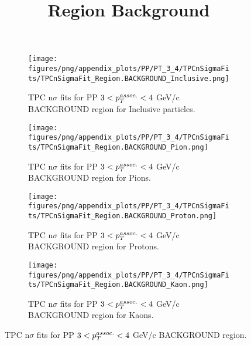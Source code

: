             \begin{figure}[H]
                \title{Region Background}
                \begin{subfigure}[b]{0.5\textwidth}
                    \centering
                    \texttt{[image: figures/png/appendix\_plots/PP/PT\_3\_4/TPCnSigmaFits/TPCnSigmaFit\_Region.BACKGROUND\_Inclusive.png]}
                    \caption{TPC n$\sigma$ fits for PP $3 < \pTassoc < 4$ GeV/c BACKGROUND region for Inclusive particles.}
                    \label{fig:appendix_PP_$3 < \pTassoc < 4$ GeV/c_BACKGROUND_Inclusive}
                \end{subfigure}
                \begin{subfigure}[b]{0.5\textwidth}
                    \centering
                    \texttt{[image: figures/png/appendix\_plots/PP/PT\_3\_4/TPCnSigmaFits/TPCnSigmaFit\_Region.BACKGROUND\_Pion.png]}
                    \caption{TPC n$\sigma$ fits for PP $3 < \pTassoc < 4$ GeV/c BACKGROUND region for Pions.}
                    \label{fig:appendix_PP_$3 < \pTassoc < 4$ GeV/c_BACKGROUND_Pion}
                \end{subfigure}
                \begin{subfigure}[b]{0.5\textwidth}
                    \centering
                    \texttt{[image: figures/png/appendix\_plots/PP/PT\_3\_4/TPCnSigmaFits/TPCnSigmaFit\_Region.BACKGROUND\_Proton.png]}
                    \caption{TPC n$\sigma$ fits for PP $3 < \pTassoc < 4$ GeV/c BACKGROUND region for Protons.}
                    \label{fig:appendix_PP_$3 < \pTassoc < 4$ GeV/c_BACKGROUND_Proton}
                \end{subfigure}
                \begin{subfigure}[b]{0.5\textwidth}
                    \centering
                    \texttt{[image: figures/png/appendix\_plots/PP/PT\_3\_4/TPCnSigmaFits/TPCnSigmaFit\_Region.BACKGROUND\_Kaon.png]}
                    \caption{TPC n$\sigma$ fits for PP $3 < \pTassoc < 4$ GeV/c BACKGROUND region for Kaons.}
                    \label{fig:appendix_PP_$3 < \pTassoc < 4$ GeV/c_BACKGROUND_Kaon}
                \end{subfigure}
                \caption{TPC n$\sigma$ fits for PP $3 < \pTassoc < 4$ GeV/c BACKGROUND region.}
                \label{fig:appendix_PP_$3 < \pTassoc < 4$ GeV/c_BACKGROUND}
            \end{figure}
            \clearpage
            
